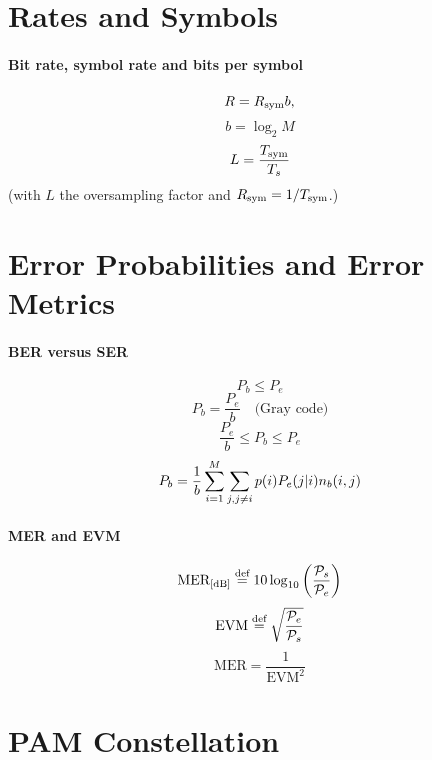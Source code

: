 \section*{Rates and Symbols}

\paragraph{Bit rate, symbol rate and bits per symbol}
\[R={R_{\textrm{sym}}} b,\]
\[b=\log_2 M\]
\begin{equation}
L = \frac{{T_{\textrm{sym}}}}{{T_s}}
\label{eq:oversampling_factor}
\end{equation}
(with $L$ the oversampling factor and ${R_{\textrm{sym}}} = 1/{T_{\textrm{sym}}}$.)

\section*{Error Probabilities and Error Metrics}

\paragraph{BER versus SER}
\begin{equation}
P_b \le P_e
\label{eq:pbBound}
\end{equation}
\begin{equation}
P_b = \frac{P_e}{b} \quad \text{(Gray code)}
\label{eq:gray_error_prob}
\end{equation}
\begin{equation}
\frac{P_e}{b} \le P_b \le P_e
\label{eq:pbTwoBounds}
\end{equation}
\[
P_b = \frac{1}{b} \sum_{\vphantom{j}i=1}^M \sum_{j, j \ne i} p(i) P_e(j|i) n_b(i,j)
\]

\paragraph{MER and EVM}
\begin{equation}
\textrm{MER}_{[\textrm{dB}]}  \stackrel{\text{def}}{=} 10 \log_{10} \left(\frac{{\cal P}_s}{{\cal P}_e}\right)
\label{eq:mer}
\end{equation}
\begin{equation}
\textrm{EVM}  \stackrel{\text{def}}{=} \sqrt{\frac{{\cal P}_e}{{\cal P}_s}}
\label{eq:evm}
\end{equation}
\begin{equation}
\textrm{MER}  = \frac{1}{\textrm{EVM}^2}
\label{eq:mer_and_evm}
\end{equation}

\section*{PAM Constellation}

